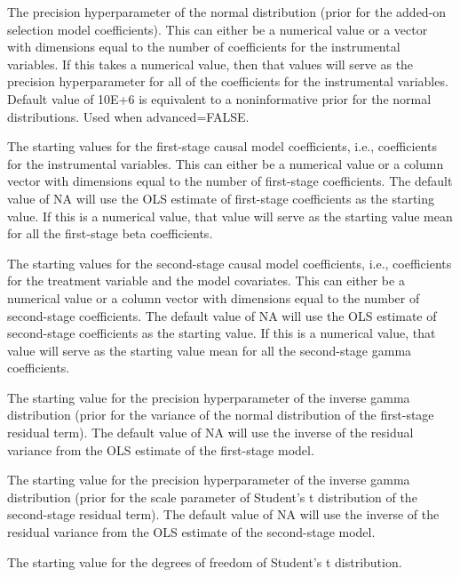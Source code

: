 \documentclass[a4paper]{book}
\begin{document}
\begin{Arguments}
\begin{ldescription}
\item[\code{L0}] The precision hyperparameter of the normal distribution (prior for the added-on selection model coefficients).
This can either be a numerical value or a vector with dimensions equal to the number of coefficients for the instrumental variables.
If this takes a numerical value, then that values will serve as the precision hyperparameter for all of the coefficients
for the instrumental variables. Default value of 10E+6 is equivalent to a noninformative prior for the normal distributions.
Used when advanced=FALSE.

\item[\code{beta.start}] The starting values for the first-stage causal model coefficients,
i.e., coefficients for the instrumental variables.
This can either be a numerical value or a column vector with dimensions
equal to the number of first-stage coefficients.
The default value of NA will use the OLS estimate of first-stage coefficients as the starting value.
If this is a numerical value, that value will
serve as the starting value mean for all the first-stage beta coefficients.

\item[\code{gamma.start}] The starting values for the second-stage causal model coefficients,
i.e., coefficients for the treatment variable and the model covariates.
This can either be a numerical value or a column vector with dimensions
equal to the number of second-stage coefficients.
The default value of NA will use the OLS estimate of second-stage coefficients as the starting value.
If this is a numerical value, that value will
serve as the starting value mean for all the second-stage gamma coefficients.

\item[\code{u.start}] The starting value for the precision hyperparameter of the inverse gamma distribution
(prior for the variance of the normal distribution of the first-stage residual term).
The default value of NA will use the inverse of the residual variance from the OLS estimate of the first-stage model.

\item[\code{e.start}] The starting value for the precision hyperparameter of the inverse gamma distribution
(prior for the scale parameter of Student's t distribution of the second-stage residual term).
The default value of NA will use the inverse of the residual variance from the OLS estimate
of the second-stage model.

\item[\code{df.start}] The starting value for the degrees of freedom of Student's t distribution.


\end{ldescription}
\end{Arguments}
\end{document}

